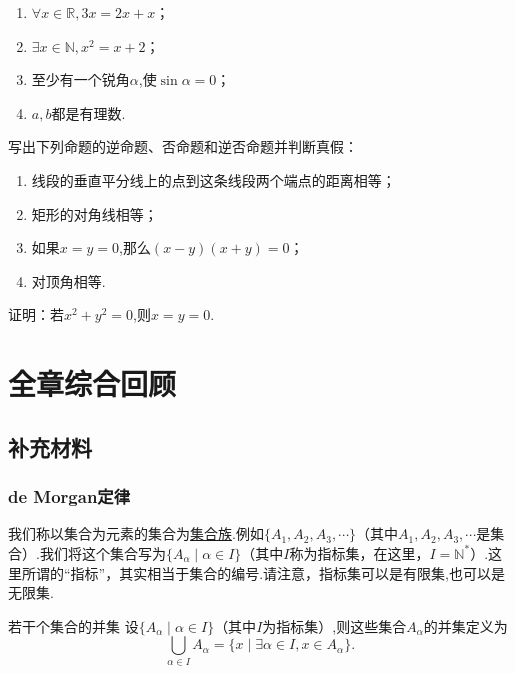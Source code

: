 \documentclass[lang=cn,math=cm,chinesefont=nofont,11pt,scheme=chinese,twocol]{elegantbook}
\begin{document}
\begin{enumerate}
  \item $\forall x\in\mathbb{R},3x=2x+x$；
  \item $\exists x\in\mathbb{N},x^2=x+2$；
  \item 至少有一个锐角$\alpha$,使$\sin\alpha=0$；
  \item $a,b$都是有理数.
\end{enumerate}

\begin{exercise}
  写出下列命题的逆命题、否命题和逆否命题并判断真假：
\end{exercise}

\begin{enumerate}
  \item 线段的垂直平分线上的点到这条线段两个端点的距离相等；
  \item 矩形的对角线相等；
  \item 如果$x=y=0$,那么$(x-y)(x+y)=0$；
  \item 对顶角相等.
\end{enumerate}

\begin{exercise}\label{2003RJA_xx2-1_P7.exp4}
  证明：若$x^2+y^2=0$,则$x=y=0$.
\end{exercise}

\section{全章综合回顾}

\subsection{补充材料}

\subsubsection{de Morgan定律}

我们称以集合为元素的集合为\underline{集合族}.例如$\{A_1,A_2,A_3,\cdots\}$（其中$A_1,A_2,A_3,\cdots$是集合）.我们将这个集合写为$\{A_\alpha\mid\alpha\in I\}$（其中$I$称为指标集，在这里，$I=\mathbb{N}^*$）.这里所谓的“指标”，其实相当于集合的编号.请注意，指标集可以是有限集,也可以是无限集.

\begin{definition}{若干个集合的并集}
  设$\{A_\alpha\mid\alpha\in I\}$（其中$I$为指标集）,则这些集合$A_\alpha$的并集定义为$$\bigcup_{\alpha\in I}A_\alpha=\{x\mid\exists\alpha\in I,x\in A_\alpha\}.$$
\end{definition}
\end{document}
